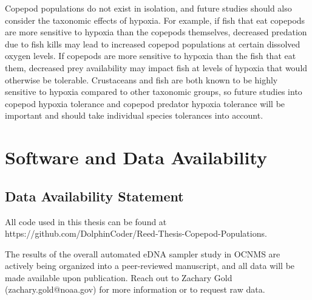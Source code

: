 \documentclass[12pt,twoside]{reedthesis}
\begin{document}
	Copepod populations do not exist in isolation, and future studies should also consider the taxonomic effects of hypoxia. For example, if fish that eat copepods are more sensitive to hypoxia than the copepods themselves, decreased predation due to fish kills may lead to increased copepod populations at certain dissolved oxygen levels. If copepods are more sensitive to hypoxia than the fish that eat them, decreased prey availability may impact fish at levels of hypoxia that would otherwise be tolerable. Crustaceans and fish are both known to be highly sensitive to hypoxia compared to other taxonomic groups, so future studies into copepod hypoxia tolerance and copepod predator hypoxia tolerance will be important and should take individual species tolerances into account.
   
   	\appendix
   \chapter{Software and Data Availability}\label{chap:appR}
   
   \section{Data Availability Statement}
   
   All code used in this thesis can be found at https://github.com/DolphinCoder/Reed-Thesis-Copepod-Populations.
   
   The results of the overall automated eDNA sampler study in OCNMS are actively being organized into a peer-reviewed manuscript, and all data will be made available upon publication. Reach out to Zachary Gold (zachary.gold@noaa.gov) for more information or to request raw data.
     
\end{document}
